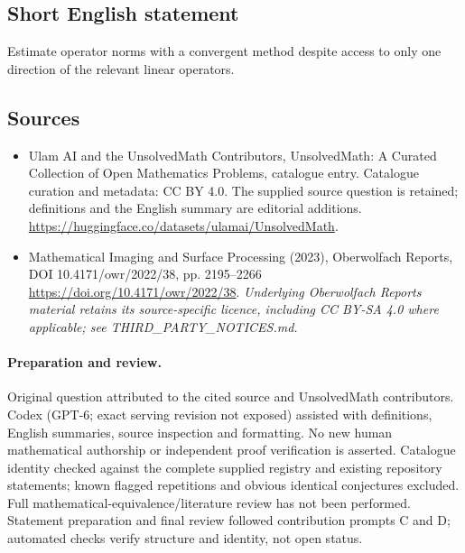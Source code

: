 \documentclass[11pt]{article}
\begin{document}
\subsection{Short English statement}
Estimate operator norms with a convergent method despite access to only one direction of the relevant linear operators.
\subsection{Sources}
\begin{itemize}
\item[\hypertarget{source:statement:1}{S1}] Ulam AI and the UnsolvedMath Contributors, UnsolvedMath: A Curated Collection of Open Mathematics Problems, catalogue entry. Catalogue curation and metadata: CC BY 4.0. The supplied source question is retained; definitions and the English summary are editorial additions.
\url{https://huggingface.co/datasets/ulamai/UnsolvedMath}.
\item[\hypertarget{source:statement:2}{S2}] Mathematical Imaging and Surface Processing (2023), Oberwolfach Reports, DOI 10.4171/owr/2022/38, pp. 2195--2266
\url{https://doi.org/10.4171/owr/2022/38}.
\textit{Underlying Oberwolfach Reports material retains its source-specific licence, including CC BY-SA 4.0 where applicable; see THIRD\_PARTY\_NOTICES.md.}
\end{itemize}
\paragraph{Preparation and review.}
Original question attributed to the cited source and UnsolvedMath contributors. Codex (GPT-6; exact serving revision not exposed) assisted with definitions, English summaries, source inspection and formatting. No new human mathematical authorship or independent proof verification is asserted. Catalogue identity checked against the complete supplied registry and existing repository statements; known flagged repetitions and obvious identical conjectures excluded. Full mathematical-equivalence/literature review has not been performed. Statement preparation and final review followed contribution prompts C and D; automated checks verify structure and identity, not open status.
\label{end:statement}
\end{document}
